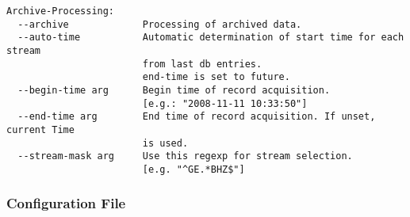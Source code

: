 \begin{small}
\begin{verbatim}
Archive-Processing:
  --archive             Processing of archived data.
  --auto-time           Automatic determination of start time for each stream
                        from last db entries.
                        end-time is set to future.
  --begin-time arg      Begin time of record acquisition.
                        [e.g.: "2008-11-11 10:33:50"]
  --end-time arg        End time of record acquisition. If unset, current Time
                        is used.
  --stream-mask arg     Use this regexp for stream selection.
                        [e.g. "^GE.*BHZ$"]
\end{verbatim}
\end{small}

\subsubsection{Configuration File}

